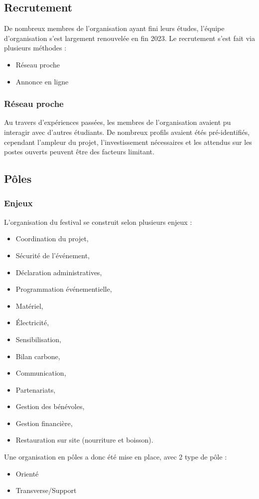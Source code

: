 \documentclass[12pt,a4paper]{report}
\begin{document}
\subsection{Recrutement}
De nombreux membres de l'organisation ayant fini leurs études, l'équipe d'organisation s'est largement renouvelée en fin 2023.
Le recrutement s'est fait via plusieurs méthodes : 
\begin{itemize}
\item Réseau proche
\item Annonce en ligne
\end{itemize}
\subsubsection{Réseau proche}
Au travers d'expériences passées, les membres de l'organisation avaient pu interagir avec d'autres étudiants. De nombreux profils avaient étés pré-identifiés, cependant l'ampleur du projet, l'investissement nécessaires et les attendus sur les postes ouverts peuvent être des facteurs limitant.

\subsection{Pôles}
\subsubsection{Enjeux}
L'organisation du festival se construit selon plusieurs enjeux : 
\begin{itemize}
\item Coordination du projet,
\item Sécurité de l'événement,
\item Déclaration administratives,
\item Programmation événementielle,
\item Matériel,
\item Électricité,
\item Sensibilisation,
\item Bilan carbone,
\item Communication,
\item Partenariats,
\item Gestion des bénévoles,
\item Gestion financière,
\item Restauration sur site (nourriture et boisson).
\end{itemize}

Une organisation en pôles a donc été mise en place, avec 2 type de pôle : 
\begin{itemize}
\item Orienté
\item Transverse/Support
\end{itemize}
\end{document}
